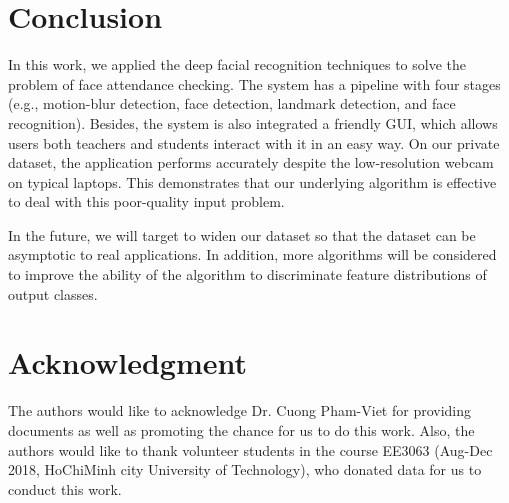 \documentclass[journal, twocolumn]{IEEEtran}
\begin{document}
\medskip
\section{Conclusion}
\label{conclusion}

In this work, we applied the deep facial recognition techniques to solve the problem of face attendance checking. The system has a pipeline with four stages (e.g., motion-blur detection, face detection, landmark detection, and face recognition). Besides, the system is also integrated a friendly GUI, which allows users both teachers and students interact with it in an easy way. On our private dataset, the application performs accurately despite the low-resolution webcam on typical laptops. This demonstrates that our underlying algorithm is effective to deal with this poor-quality input problem.

In the future, we will target to widen our dataset so that the dataset can be asymptotic to real applications. In addition, more algorithms will be considered to improve the ability of the algorithm to discriminate feature distributions of output classes.


\section*{Acknowledgment}

The authors would like to acknowledge Dr. Cuong Pham-Viet for providing documents as well as promoting the chance for us to do this work. Also, the authors would like to thank volunteer students in the course EE3063 (Aug-Dec 2018, HoChiMinh city University of Technology), who donated data for us to conduct this work.


\begin{thebibliography}{9}

\end{thebibliography}
\end{document}
